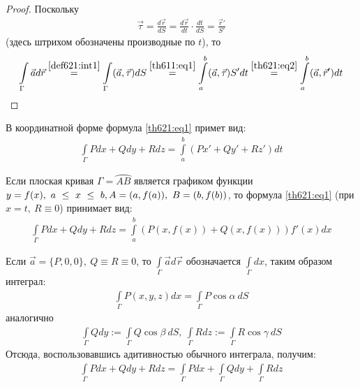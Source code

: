 \begin{proof}
  Поскольку
  \begin{gather}
    \vec \tau = \frac{d \vec r}{dS} = \frac{d \vec r}{dt} \cdot
    \frac{dt}{dS} = \frac{\vec r'}{S'}
    \label{th621:eq2}
  \end{gather}
  (здесь штрихом обозначены производные по $t$), то
  \begin{gather*}
    \int\limits_\Gamma \vec a d \vec r \overset{\eqref{def621:int1}} =
    \int\limits_\Gamma (\vec a, \vec \tau) dS \overset{\eqref{th611:eq1}} =
    \int\limits_a^b (\vec a, \vec \tau) S' dt \overset{\eqref{th621:eq2}} =
    \int\limits_a^b (\vec a, \vec r') dt
  \end{gather*}
\end{proof}

\begin{remark}
  В координатной форме формула \eqref{th621:eq1} примет вид:
  \begin{gather}
    \int\limits_\Gamma Pdx + Qdy + Rdz = \int\limits_a^b (P x' + Q y' + R z')dt
    \label{rem621:eq1}
  \end{gather}
\end{remark}

\begin{consequence}
  Если плоская кривая $\Gamma = \wideparen{AB}$ является графиком функции $y =
  f(x), \ a~\leq~x~\leq~b, \\ A = (a, f(a)), \ B = (b, f(b))$, то формула
  \eqref{th621:eq1} (при $x = t, \ R \equiv 0$) принимает вид:
  \begin{gather}
  \int\limits_\Gamma Pdx + Qdy + Rdz = \int\limits_a^b (P(x, f(x)) + Q(x,
  f(x))) f'(x) dx
  \label{cons621:eq1}
  \end{gather}
\end{consequence}

\begin{remark}
  Если $\vec a = \{P, 0, 0\}, \ Q \equiv R \equiv 0$, то $\int\limits_\Gamma
  \vec a d \vec r$ обозначается $\int\limits_\Gamma dx$, таким образом
  интеграл:
  \begin{gather}
    \int\limits_\Gamma P(x, y, z) dx = \int\limits_\Gamma P \cos \alpha \ dS
    \label{rem622:eq1}
  \end{gather}
  аналогично
  \begin{gather}
    \int\limits_\Gamma Q dy := \int\limits_\Gamma Q \cos \beta \ dS,
    \ \int\limits_\Gamma R dz := \int\limits_\Gamma R \cos \gamma \ dS
    \label{rem622:eq2}
  \end{gather}
  Отсюда, воспользовавшись адитивностью обычного интеграла, получим:
  \begin{gather*}
    \int\limits_\Gamma Pdx + Qdy + Rdz = \int\limits_\Gamma Pdx +
    \int\limits_\Gamma Qdy + \int\limits_\Gamma Rdz
    \label{rem622:eq3}
  \end{gather*}
\end{remark}

